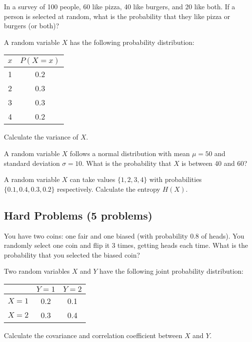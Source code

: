 \begin{problem}
In a survey of 100 people, 60 like pizza, 40 like burgers, and 20 like both. If a person is selected at random, what is the probability that they like pizza or burgers (or both)?
\end{problem}

\begin{problem}
A random variable $X$ has the following probability distribution:
\begin{center}
\begin{tabular}{|c|c|}
\hline
$x$ & $P(X=x)$ \\
\hline
1 & 0.2 \\
2 & 0.3 \\
3 & 0.3 \\
4 & 0.2 \\
\hline
\end{tabular}
\end{center}
Calculate the variance of $X$.
\end{problem}

\begin{problem}
A random variable $X$ follows a normal distribution with mean $\mu = 50$ and standard deviation $\sigma = 10$. What is the probability that $X$ is between 40 and 60?
\end{problem}

\begin{problem}
A random variable $X$ can take values $\{1, 2, 3, 4\}$ with probabilities $\{0.1, 0.4, 0.3, 0.2\}$ respectively. Calculate the entropy $H(X)$.
\end{problem}

\subsection{Hard Problems (5 problems)}

\begin{problem}
You have two coins: one fair and one biased (with probability 0.8 of heads). You randomly select one coin and flip it 3 times, getting heads each time. What is the probability that you selected the biased coin?
\end{problem}

\begin{problem}
Two random variables $X$ and $Y$ have the following joint probability distribution:
\begin{center}
\begin{tabular}{|c|c|c|}
\hline
 & $Y=1$ & $Y=2$ \\
\hline
$X=1$ & 0.2 & 0.1 \\
$X=2$ & 0.3 & 0.4 \\
\hline
\end{tabular}
\end{center}
Calculate the covariance and correlation coefficient between $X$ and $Y$.
\end{problem}

